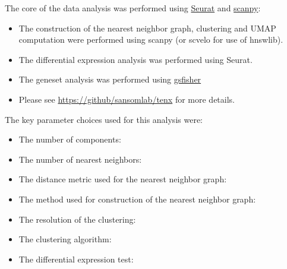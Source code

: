 The core of the data analysis was performed using \href{http://satijalab.org/seurat/}{Seurat} and \href{https://scanpy.readthedocs.io/}{scanpy}:

\begin{itemize}
\item The construction of the nearest neighbor graph, clustering and UMAP computation were performed using scanpy (or scvelo for use of hnswlib).
\item The differential expression analysis was performed using Seurat.
\item The geneset analysis was performed using \href{https://github.com/sansomlab/gsfisher}{gsfisher}
\item Please see \href{https://github.com/sansomlab/tenx}{https://github/sansomlab/tenx} for more details.
\end{itemize}

The key parameter choices used for this analysis were:

\begin{itemize}
\item The number of \reductionType{} components: \nPCs
\item The number of nearest neighbors: \nnK
\item The distance metric used for the nearest neighbor graph: \nnMetric
\item The method used for construction of the nearest neighbor graph: \nnMethod
\item The resolution of the clustering: \resolution
\item The clustering algorithm: \clusteringAlgorithm
\item The differential expression test: \deTest
\end{itemize}




